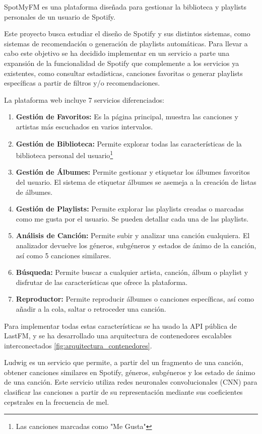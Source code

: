 
SpotMyFM es una plataforma diseñada para gestionar la biblioteca y playlists personales de un usuario de Spotify.

Este proyecto busca estudiar el diseño de Spotify y sus distintos sistemas, como sistemas de recomendación o generación de playlists automáticas. Para llevar a cabo este objetivo se ha decidido implementar en un servicio a parte una expansión de la funcionalidad de Spotify que complemente a los servicios ya existentes, como consultar estadísticas, canciones favoritas o generar playlists específicas a partir de filtros y/o recomendaciones.

La plataforma web incluye 7 servicios diferenciados:
\begin{enumerate}
    \item \textbf{Gestión de Favoritos:} Es la página principal, muestra las canciones y artistas más escuchados en varios intervalos.
    \item \textbf{Gestión de Biblioteca:} Permite explorar todas las características de la biblioteca personal del usuario\footnote{Las canciones marcadas como "Me Gusta"}
    \item \textbf{Gestión de Álbumes:} Permite gestionar y etiquetar los álbumes favoritos del usuario. El sistema de etiquetar álbumes se asemeja a la creación de listas de álbumes. 
    \item \textbf{Gestión de Playlists:} Permite explorar las playlists creadas o marcadas como me gusta por el usuario. Se pueden detallar cada una de las playlists.
    \item \textbf{Análisis de Canción:} Permite subir y analizar una canción cualquiera. El analizador devuelve los géneros, subgéneros y estados de ánimo de la canción, así como 5 canciones similares. 
    \item \textbf{Búsqueda:} Permite buscar a cualquier artista, canción, álbum o playlist y disfrutar de las características que ofrece la plataforma. 
    \item \textbf{Reproductor:} Permite reproducir álbumes o canciones específicas, así como añadir a la cola, saltar o retroceder una canción.
\end{enumerate}


Para implementar todas estas características se ha usado la API pública de LastFM, y se ha desarrollado una arquitectura de contenedores escalables interconectados \ref{fig:arquitectura_contenedores}.

Ludwig es un servicio que permite, a partir del un fragmento de una canción, obtener canciones similares en Spotify, géneros, subgéneros y los estado de ánimo de una canción. Este servicio utiliza redes neuronales convolucionales (CNN) para clasificar las canciones a partir de su representación mediante sus coeficientes cepstrales en la frecuencia de mel.

